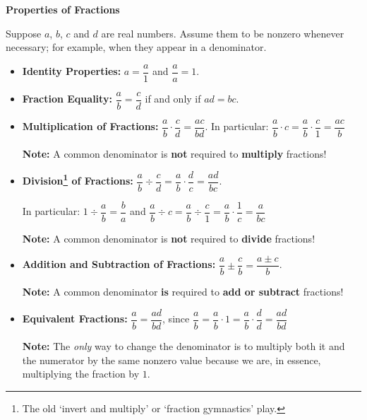 \colorbox{ResultColor}{\bbm

\centerline{\textbf{Properties of Fractions}}

Suppose $a$, $b$, $c$ and $d$ are real numbers.  Assume them to be nonzero whenever necessary; for example,  when they appear in a denominator.

\begin{itemize}

\item  \textbf{Identity Properties:}  $a = \dfrac{a}{1}$ and $\dfrac{a}{a} = 1$.

\item  \textbf{Fraction Equality:}  $\dfrac{a}{b} = \dfrac{c}{d}$ if and only if $ad = bc$. 

\item  \textbf{Multiplication of Fractions:}  $\dfrac{a}{b} \cdot \dfrac{c}{d} = \dfrac{ac}{bd}$. In particular:  $\dfrac{a}{b} \cdot c = \dfrac{a}{b} \cdot \dfrac{c}{1} = \dfrac{ac}{b}$

\textbf{Note:}  A common denominator is \textbf{not} required to \textbf{multiply} fractions!

\item  \textbf{Division\footnote{The old `invert and multiply' or `fraction gymnastics' play.} of Fractions:}  $\dfrac{a}{b} \div \dfrac{c}{d} = \dfrac{a}{b} \cdot \dfrac{d}{c} = \dfrac{ad}{bc}$. 

In particular: $1 \div \dfrac{a}{b} = \dfrac{b}{a}$ and  $\dfrac{a}{b} \div c = \dfrac{a}{b} \div \dfrac{c}{1}  = \dfrac{a}{b} \cdot \dfrac{1}{c} = \dfrac{a}{bc}$

\textbf{Note:}  A common denominator is \textbf{not} required to \textbf{divide} fractions!

\item  \textbf{Addition and Subtraction of Fractions:}  $\dfrac{a}{b} \pm \dfrac{c}{b} = \dfrac{a \pm c}{b}$.  

\textbf{Note:}  A common denominator \textbf{is} required to \textbf{add or subtract} fractions!

\item  \textbf{Equivalent Fractions:}  $\dfrac{a}{b} = \dfrac{ad}{bd}$, since $ \dfrac{a}{b} = \dfrac{a}{b} \cdot 1 = \dfrac{a}{b} \cdot \dfrac{d}{d} = \dfrac{ad}{bd}$

\textbf{Note:}  The \textit{only} way to change the denominator is to multiply both it and the numerator by the same nonzero value because we are, in essence, multiplying the fraction by $1$.


\end{itemize}}
